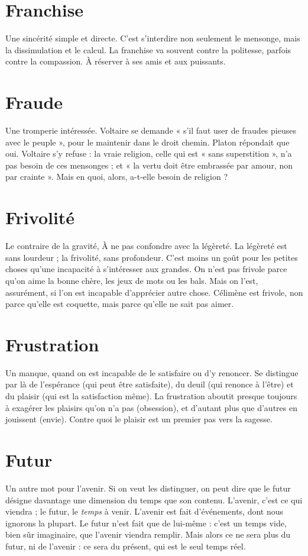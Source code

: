 \section{Franchise}
Une sincérité simple et directe. C’est s’interdire non seulement
le mensonge, mais la dissimulation et le calcul. La franchise
va souvent contre la politesse, parfois contre la compassion. À réserver à
ses amis et aux puissants.

\section{Fraude}
Une tromperie intéressée. Voltaire se demande « s’il faut user de
fraudes pieuses avec le peuple », pour le maintenir dans le droit
chemin. Platon répondait que oui. Voltaire s’y refuse : la vraie religion, celle
qui est « sans superstition », n’a pas besoin de ces mensonges ; et « la vertu doit
être embrassée par amour, non par crainte ». Mais en quoi, alors, a-t-elle besoin
de religion ?

\section{Frivolité}
Le contraire de la gravité, À ne pas confondre avec la légèreté.
La légèreté est sans lourdeur ; la frivolité, sans profondeur.
C’est moins un goût pour les petites choses qu’une incapacité à s'intéresser aux
grandes. On n’est pas frivole parce qu’on aime la bonne chère, les jeux de mots
ou les bals. Mais on l’est, assurément, si l’on est incapable d’apprécier autre
chose. Célimène est frivole, non parce qu’elle est coquette, mais parce qu’elle
ne sait pas aimer.

\section{Frustration}
Un manque, quand on est incapable de le satisfaire ou d’y
renoncer. Se distingue par là de l’espérance (qui peut être
satisfaite), du deuil (qui renonce à l'être) et du plaisir (qui est la satisfaction
même).
La frustration aboutit presque toujours à exagérer les plaisirs qu’on n’a pas
(obsession), et d’autant plus que d’autres en jouissent (envie). Contre quoi le
plaisir est un premier pas vers la sagesse.

\section{Futur}
Un autre mot pour l'avenir. Si on veut les distinguer, on peut dire
que le futur désigne davantage une dimension du temps que son
contenu. L'avenir, c’est ce qui viendra ; le futur, le {\it temps} à venir. L'avenir est
fait d'événements, dont nous ignorons la plupart. Le futur n’est fait que de lui-même :
c’est un temps vide, bien sûr imaginaire, que l’avenir viendra remplir.
Mais alors ce ne sera plus du futur, ni de l’avenir : ce sera du présent, qui est le
seul temps réel.

